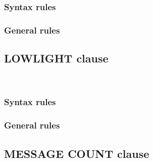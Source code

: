 \begin{syntax}[\miscextcolour]
\end{syntax}

\subsubsection{Syntax rules}

\subsubsection{General rules}

\subsection{LOWLIGHT clause}

\begin{syntax}
  \begin{1=}
     \\
  \end{1=}
\end{syntax}

\subsubsection{Syntax rules}

\subsubsection{General rules}

\subsection{MESSAGE COUNT clause}

\begin{syntax}[\deletedcolour]
\end{syntax}

